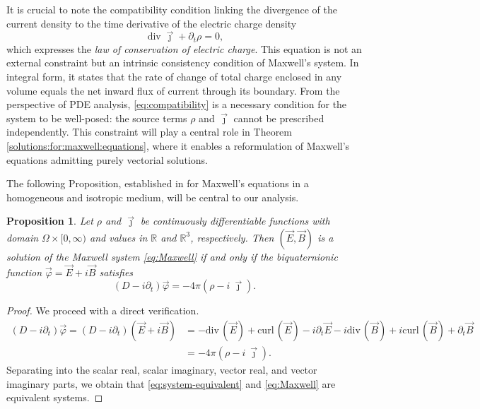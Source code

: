 \documentclass[12pt]{article}
\newtheorem{proposition}[theorem]{Proposition}
\def\R{\mathbb{R}}
\def\div{\mbox{div}\,}
\def\curl{\mbox{curl}\,}
\def\R{\mathbb{R}}
\begin{document}
It is crucial to note the compatibility condition linking the divergence 
of the current density to the time derivative of the electric charge density
\begin{equation}\label{eq:compatibility}
    \operatorname{div }\vec{\jmath}+\partial_t\rho=0,
\end{equation}
which expresses the \textit{law of conservation of electric charge}. 
This equation is not an external constraint but an intrinsic consistency 
condition of Maxwell's system. In integral form, it states that the rate of change of total charge 
enclosed in any volume equals the net inward flux of current through its 
boundary. From the perspective 
of PDE analysis, \eqref{eq:compatibility} is a necessary condition for the 
system to be well-posed: the source terms $\rho$ and $\vec{\jmath}$ cannot 
be prescribed independently. This constraint will play a central role in 
Theorem \ref{solutions:for:maxwell:equations}, where it enables a reformulation 
of Maxwell's equations admitting purely vectorial solutions.

The following Proposition, established in \cite[Sec.\ 3.1.1]{kravchenko2003applied} for Maxwell's equations 
in a homogeneous and isotropic medium, will be central to our analysis.
\begin{proposition}\label{eq:equivalence-Maxwell}
    Let $\rho$ and $\vec\jmath$ be continuously differentiable functions with domain $\Omega\times[0,\infty)$ and values in $\R$ and $\R^3$, respectively. Then $(\vec E, \vec B)$ is a solution of the Maxwell system \eqref{eq:Maxwell}  if and only if the biquaternionic function $\vec \varphi=\vec E+i\vec B$ satisfies 
    \begin{equation}\label{eq:system-equivalent}
            (D-i\partial_t)\vec \varphi=-4\pi(\rho-i\:\vec \jmath).
        \end{equation}
\end{proposition}

\begin{proof}
We proceed with a direct verification. 
\begin{align*}
        (D-i\partial_t)\vec \varphi=(D-i\partial_t)(\vec E+i\vec B)&=-\div(\vec E)+\curl(\vec E)-i\partial_t\vec E-i\div(\vec B)+i\curl(\vec B)+\partial_t\vec B\\
        &=-4\pi(\rho-i\:\vec\jmath).
\end{align*}
Separating into the scalar real, scalar imaginary, vector real, and vector imaginary parts, we obtain that \eqref{eq:system-equivalent} and \eqref{eq:Maxwell} are equivalent systems.
\end{proof}
\end{document}
